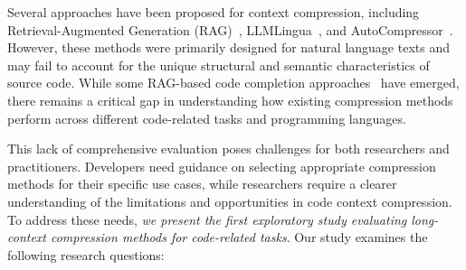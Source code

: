 Several approaches have been proposed for context compression, including Retrieval-Augmented Generation (RAG)~\cite{lewis2020retrieval}, LLMLingua~\cite{jiang2023llmlingua}, and AutoCompressor~\cite{chevalier2023adapting}. However, these methods were primarily designed for natural language texts and may fail to account for the unique structural and semantic characteristics of source code. While some RAG-based code completion approaches~\cite{wang2024rlcoder,zhang2023repocoder,hostnik2025retrieval,tan2024prompt} have emerged, there remains a critical gap in understanding how existing compression methods perform across different code-related tasks and programming languages.





This lack of comprehensive evaluation poses challenges for both researchers and practitioners. Developers need guidance on selecting appropriate compression methods for their specific use cases, while researchers require a clearer understanding of the limitations and opportunities in code context compression. To address these needs, \textit{we present the first exploratory study evaluating long-context compression methods for code-related tasks}. Our study examines the following research questions:

